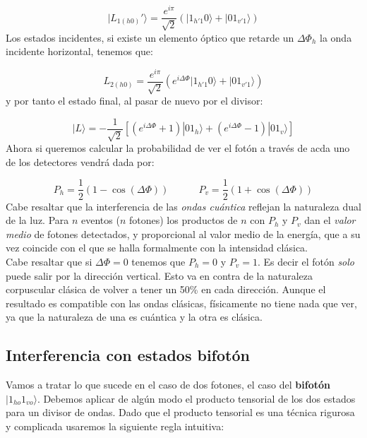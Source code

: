 \documentclass[12pt,a4paper]{book}
\numberwithin{equation}{section}
\numberwithin{figure}{section}
\newcommand{\tquad}{\quad \quad \quad}
\newcommand{\parentesis}[1]{\left( #1  \right)}
\newcommand{\ccorchetes}[1]{\left[ #1  \right]}
\newcommand{\1}{_{(1)}}
\newcommand{\2}{_{(2)}}
\theoremstyle{definition}
\begin{document}
\begin{equation}
|L_{1(h0)}' \rangle = \frac{e^{i\pi}}{\sqrt{2}} \parentesis{|1_{h'1}0\rangle + |01_{v'1}\rangle}
\end{equation}
Los estados incidentes, si existe un elemento óptico que retarde un $\Delta \Phi_h$ la onda incidente horizontal, tenemos que:

\begin{equation}
L_{2(h0)} =  \frac{e^{i\pi}}{\sqrt{2}} \parentesis{e^{i\Delta \Phi} |1_{h'1}0\rangle + |01_{v'1}\rangle}
\end{equation}
y por tanto el estado final, al pasar de nuevo por el divisor:

\begin{equation}
|L\rangle = - \frac{1}{\sqrt{2}} \ccorchetes{ \parentesis{e^{i \Delta \Phi} +1  } |01_h \rangle + \parentesis{e^{i \Delta \Phi} - 1 } |01_v\rangle}
\end{equation}
Ahora si queremos calcular la probabilidad de ver el fotón a través de acda uno de los detectores vendrá dada por:

\begin{equation}
P_h = \frac{1}{2} (1- \cos (\Delta \Phi)) \tquad P_v = \frac{1}{2} (1+\cos (\Delta \Phi))
\end{equation}
Cabe resaltar que la interferencia de las \textit{ondas cuántica} reflejan la naturaleza dual de la luz. Para $n$ eventos ($n$ fotones) los productos de $n$ con $P_{h}$ y  $P_v$ dan el \textit{valor medio} de fotones detectados, y proporcional al valor medio de la energía, que a su vez coincide con el que se halla formalmente con la intensidad clásica. \\

Cabe resaltar que si $\Delta \Phi = 0$ tenemos que $P_h=0$ y $P_v=1$. Es decir el fotón \textit{solo} puede salir por la dirección vertical. Esto va en contra de la  naturaleza corpuscular clásica de volver a tener un 50\% en cada dirección. Aunque el resultado es compatible con las ondas clásicas, físicamente no tiene nada que ver, ya que la naturaleza de una es cuántica y la otra es clásica. \\

\subsection{Interferencia con estados bifotón}

Vamos a tratar lo que sucede en el caso de dos fotones, el caso del \textbf{bifotón} $|1_{ho} 1_{vo}\rangle$. Debemos aplicar de algún modo el producto tensorial de los dos estados para un divisor de ondas. Dado que el producto tensorial es una técnica rigurosa y complicada usaremos la siguiente regla intuitiva:
\end{document}
